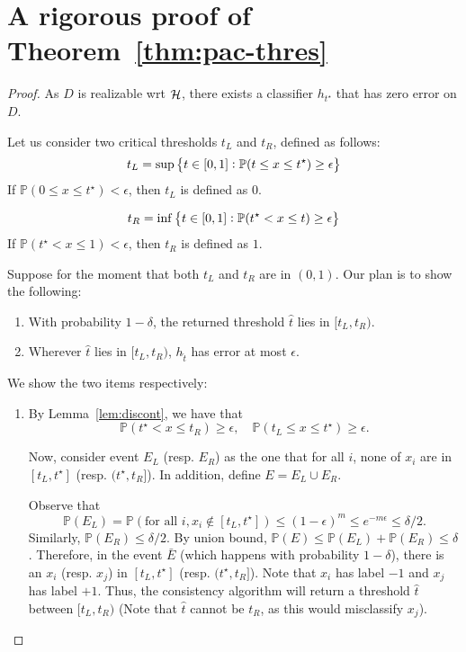 \documentclass{article}
\DeclareMathOperator*{\Hcal}{{\cal H}}
\newcommand{\PP}{\mathbb{P}}
\begin{document}
\section{A rigorous proof of Theorem~\ref{thm:pac-thres}}
\label{app:rig}

\begin{proof}
  As $D$ is realizable wrt $\Hcal$, there exists a classifier $h_{t^\star}$ that has zero error on $D$.

  Let us consider two critical thresholds $t_L$ and $t_R$, defined as follows:
  \[ t_L = \sup\cbr{t \in [0,1]: \PP(t \leq x \leq t^\star) \geq \epsilon} \]
  If $\PP(0 \leq x \leq t^\star) < \epsilon$, then $t_L$ is defined as $0$.

  \[ t_R = \inf\cbr{t \in [0,1]: \PP(t^\star < x \leq t) \geq \epsilon} \]
  If $\PP(t^\star < x \leq 1) < \epsilon$, then $t_R$ is defined as $1$.

  Suppose for the moment that both $t_L$ and $t_R$ are in $(0,1)$.
  Our plan is to show the following:
  \begin{enumerate}
    \item With probability $1-\delta$, the returned threshold $\hat{t}$ lies in $[t_L, t_R)$.
    \item Wherever $\hat{t}$ lies in $[t_L, t_R)$, $h_{\hat{t}}$ has error at most $\epsilon$.
  \end{enumerate}

  We show the two items respectively:
  \begin{enumerate}
    \item By Lemma~\ref{lem:discont}, we have that
    \[ \PP(t^\star < x \leq t_R) \geq \epsilon, \quad \PP(t_L \leq x \leq t^\star) \geq \epsilon. \]

    Now, consider event $E_L$ (resp. $E_R$) as the one that for all $i$, none of $x_i$ are in $[t_L, t^\star]$ (resp. $(t^\star, t_R]$). In addition, define $E = E_L \cup E_R$.

    Observe that
    \[ \PP(E_L) = \PP(\text{for all } i, x_i \notin [t_L, t^\star]) \leq (1-\epsilon)^m \leq e^{-m\epsilon} \leq \delta/2. \]
    Similarly, $\PP(E_R) \leq \delta/2$. By union bound, $\PP(E) \leq \PP(E_L) + \PP(E_R) \leq \delta$. Therefore, in the event $\bar{E}$ (which happens with probability $1-\delta$), there is an $x_i$ (resp. $x_j$) in $[t_L, t^\star]$ (resp. $(t^\star, t_R]$).
    Note that $x_i$ has label $-1$ and $x_j$ has label $+1$. Thus, the consistency algorithm
    will return a threshold $\hat{t}$ between $[t_L, t_R)$ (Note that $\hat{t}$ cannot be $t_R$, as this would misclassify $x_j$).



\end{enumerate}
\end{proof}
\end{document}
